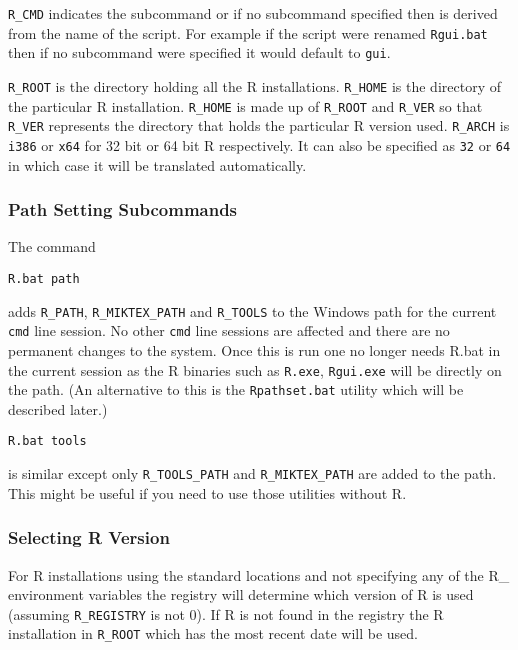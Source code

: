 \texttt{R\_CMD} indicates the subcommand or if no subcommand specified
then is derived from the name of the script. For example if the script
were renamed \texttt{Rgui.bat} then if no subcommand were specified it
would default to \texttt{gui}.

\texttt{R\_ROOT} is the directory holding all the R installations.
\texttt{R\_HOME} is the directory of the particular R installation.
\texttt{R\_HOME} is made up of \texttt{R\_ROOT} and \texttt{R\_VER} so
that \texttt{R\_VER} represents the directory that holds the particular
R version used. \texttt{R\_ARCH} is \texttt{i386} or \texttt{x64} for 32
bit or 64 bit R respectively. It can also be specified as \texttt{32} or
\texttt{64} in which case it will be translated automatically.

\subsubsection{Path Setting Subcommands}

The command

\begin{verbatim}
R.bat path
\end{verbatim}

adds \texttt{R\_PATH}, \texttt{R\_MIKTEX\_PATH} and \texttt{R\_TOOLS} to
the Windows path for the current \texttt{cmd} line session. No other
\texttt{cmd} line sessions are affected and there are no permanent
changes to the system. Once this is run one no longer needs R.bat in the
current session as the R binaries such as \texttt{R.exe},
\texttt{Rgui.exe} will be directly on the path. (An alternative to this
is the \texttt{Rpathset.bat} utility which will be described later.)

\begin{verbatim}
R.bat tools
\end{verbatim}

is similar except only \texttt{R\_TOOLS\_PATH} and
\texttt{R\_MIKTEX\_PATH} are added to the path. This might be useful if
you need to use those utilities without R.

\subsubsection{Selecting R Version}

For R installations using the standard locations and not specifying any
of the R\_ environment variables the registry will determine which
version of R is used (assuming \texttt{R\_REGISTRY} is not 0). If R is
not found in the registry the R installation in \texttt{R\_ROOT} which
has the most recent date will be used.

